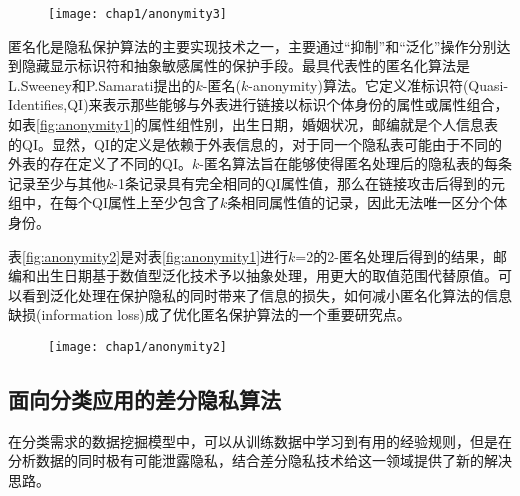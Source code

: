 \begin{figure}[!htp]
	\centering
	\texttt{[image: chap1/anonymity3]}
\end{figure}


匿名化是隐私保护算法的主要实现技术之一，主要通过“抑制”和“泛化”操作分别达到隐藏显示标识符和抽象敏感属性的保护手段。最具代表性的匿名化算法是L.Sweeney和P.Samarati提出的$k$-匿名($k$-anonymity)\cite{k-anonymity}算法。它定义准标识符(Quasi-Identifies,QI)来表示那些能够与外表进行链接以标识个体身份的属性或属性组合，如表\ref{fig:anonymity1}的属性组{性别，出生日期，婚姻状况，邮编}就是个人信息表的QI。显然，QI的定义是依赖于外表信息的，对于同一个隐私表可能由于不同的外表的存在定义了不同的QI。$k$-匿名算法旨在能够使得匿名处理后的隐私表的每条记录至少与其他$k$-1条记录具有完全相同的QI属性值，那么在链接攻击后得到的元组中，在每个QI属性上至少包含了$k$条相同属性值的记录，因此无法唯一区分个体身份。

表\ref{fig:anonymity2}是对表\ref{fig:anonymity1}进行$k$=2的2-匿名处理后得到的结果，邮编和出生日期基于数值型泛化技术予以抽象处理，用更大的取值范围代替原值。可以看到泛化处理在保护隐私的同时带来了信息的损失，如何减小匿名化算法的信息缺损(information loss)\cite{Bottom-up generalization}\cite{Top-down specialization}成了优化匿名保护算法的一个重要研究点。

\begin{figure}[!htp]
	\centering
	\texttt{[image: chap1/anonymity2]}
\end{figure}

\subsection{面向分类应用的差分隐私算法}  %

在分类需求的数据挖掘模型中，可以从训练数据中学习到有用的经验规则，但是在分析数据的同时极有可能泄露隐私，结合差分隐私技术给这一领域提供了新的解决思路。

